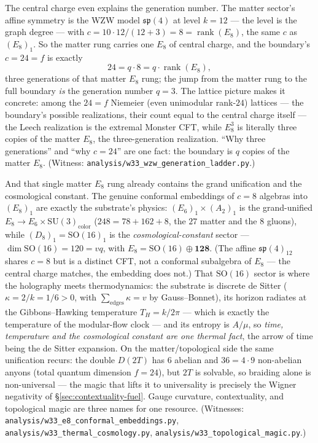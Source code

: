 \documentclass[11pt]{article}
\begin{document}
The central charge even explains the generation number. The matter sector's affine
symmetry is the WZW model $\mathfrak{sp}(4)$ at level $k=12$ --- the level is the
graph degree --- with $c=10\cdot12/(12+3)=8=\operatorname{rank}(E_8)$, the same
$c$ as $(E_8)_1$. So the matter rung carries one $E_8$ of central charge, and the
boundary's $c=24=f$ is exactly
\[
  24 = q\cdot 8 = q\cdot\operatorname{rank}(E_8),
\]
three generations of that matter $E_8$ rung; the jump from the matter rung to the
full boundary \emph{is} the generation number $q=3$. The lattice picture makes it
concrete: among the $24=f$ Niemeier (even unimodular rank-$24$) lattices --- the
boundary's possible realizations, their count equal to the central charge itself
--- the Leech realization is the extremal Monster CFT, while $E_8^3$ is literally
three copies of the matter $E_8$, the three-generation realization. ``Why three
generations'' and ``why $c=24$'' are one fact: the boundary is $q$ copies of the
matter $E_8$. (Witness:
\texttt{analysis/w33\_wzw\_generation\_ladder.py}.)

And that single matter $E_8$ rung already contains the grand unification and the
cosmological constant. The genuine conformal embeddings of $c=8$ algebras into
$(E_8)_1$ are exactly the substrate's physics: $(E_6)_1\times(A_2)_1$ is the
grand-unified $E_8\to E_6\times\mathrm{SU}(3)_{\text{color}}$ ($248=78+162+8$, the
$27$ matter and the $8$ gluons), while $(D_8)_1=\mathrm{SO}(16)_1$ is the
\emph{cosmological-constant} sector --- $\dim\mathrm{SO}(16)=120=vq$, with
$E_8=\mathrm{SO}(16)\oplus\mathbf{128}$. (The affine $\mathfrak{sp}(4)_{12}$ shares
$c=8$ but is a distinct CFT, not a conformal subalgebra of $E_8$ --- the central
charge matches, the embedding does not.) That $\mathrm{SO}(16)$ sector is where the
holography meets thermodynamics: the substrate is discrete de Sitter
($\kappa=2/k=1/6>0$, with $\sum_{\text{edges}}\kappa=v$ by Gauss--Bonnet), its
horizon radiates at the Gibbons--Hawking temperature $T_H=k/2\pi$ --- which is
exactly the temperature of the modular-flow clock --- and its entropy is $A/\mu$,
so \emph{time, temperature and the cosmological constant are one thermal fact}, the
arrow of time being the de Sitter expansion. On the matter/topological side the
same unification recurs: the double $D(2T)$ has $6$ abelian and $36=4\cdot9$
non-abelian anyons (total quantum dimension $f=24$), but $2T$ is solvable, so
braiding alone is non-universal --- the magic that lifts it to universality is
precisely the Wigner negativity of \S\ref{sec:contextuality-fuel}. Gauge curvature,
contextuality, and topological magic are three names for one resource. (Witnesses:
\texttt{analysis/w33\_e8\_conformal\_embeddings.py},
\texttt{analysis/w33\_thermal\_cosmology.py},
\texttt{analysis/w33\_topological\_magic.py}.)
\end{document}
